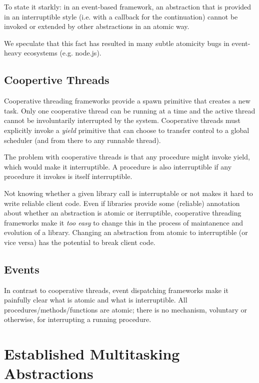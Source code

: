 \documentclass[9pt,preprint]{sigplanconf}
\begin{document}
To state it starkly: in an event-based framework, an abstraction that is provided in an interruptible style (i.e. with a callback for the continuation) cannot be invoked or extended by other abstractions in an atomic way.

We speculate that this fact has resulted in many subtle atomicity bugs in event-heavy ecosystems (e.g. node.js).


\subsection{Coopertive Threads}

Cooperative threading frameworks provide a spawn primitive that creates a new task.
Only one cooperative thread can be running at a time and the active thread cannot be involuntarily interrupted by the system.
Cooperative threads must explicitly invoke a \emph{yield} primitive that can choose to transfer control to a global scheduler (and from there to any runnable thread).

The problem with cooperative threads is that any procedure might invoke yield, which would make it interruptible.
A procedure is also interruptible if any procedure it invokes is itself interruptible.

Not knowing whether a given library call is interruptable or not makes it hard to write reliable client code.
Even if libraries provide some (reliable) annotation about whether an abstraction is atomic or iterruptible, cooperative threading frameworks make it \emph{too easy} to change this in the process of maintanence and evolution of a library.
Changing an abstraction from atomic to interruptible (or vice versa) has the potential to break client code.




\subsection{Events}

In contrast to cooperative threads, event dispatching frameworks make it painfully clear what is atomic and what is interruptible.
All procedures/methods/functions are atomic; there is no mechanism, voluntary or otherwise, for interrupting a running procedure.

\section{Established Multitasking Abstractions}
\end{document}
